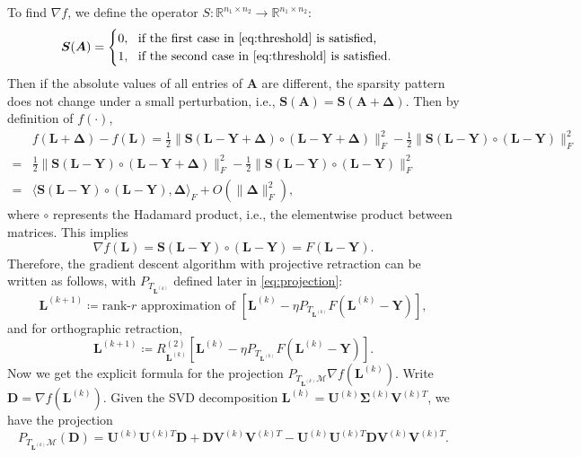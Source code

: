 \documentclass[12pt]{article}
\newcommand{\grad}{\nabla}
\newcommand{\bL}{\boldsymbol{L}}
\newcommand{\bD}{\boldsymbol{D}}
\newcommand{\bSigma}{\boldsymbol\Sigma}
\newcommand{\bDelta}{\boldsymbol\Delta}
\newcommand{\bU}{\boldsymbol{U}}
\newcommand{\bV}{\boldsymbol{V}}
\def\reals{\mathbb{R}}
\def\bS{\boldsymbol{S}}
\def\bSigma{\boldsymbol\Sigma}
\def\bDelta{\boldsymbol\Delta}
\def\bU{\boldsymbol{U}}
\def\bA{\boldsymbol{A}}
\def\bY{\boldsymbol{Y}}
\def\calM{\mathcal{M}}
\theoremstyle{plain}
\theoremstyle{definition}
\theoremstyle{plain}
\theoremstyle{plain}
\theoremstyle{remark}
\begin{document}
To find $\grad f$, we define the operator  $S: \reals^{n_1\times n_2}\rightarrow\reals^{n_1\times n_2}$: 
\[
\bS(\bA)=\begin{cases} 0,\,\,\,\, \text{if the first case in \eqref{eq:threshold} is satisfied,}\\
1,\,\,\,\, \text{if the second case in \eqref{eq:threshold} is satisfied.}\end{cases}
\]
Then if the absolute values of all entries of $\bA$ are different, the sparsity pattern does not change under a small perturbation, i.e., $\bS(\bA)=\bS(\bA+\bDelta).$ Then by definition of $f(\cdot)$,
\begin{align*}
&f(\bL+\bDelta)-f(\bL)=\frac{1}{2}\|\bS(\bL-\bY+\bDelta)\circ (\bL-\bY+\bDelta)\|_F^2-\frac{1}{2}\|\bS(\bL-\bY)\circ (\bL-\bY)\|_F^2\\
=&\frac{1}{2}\|\bS(\bL-\bY)\circ (\bL-\bY+\bDelta)\|_F^2-\frac{1}{2}\|\bS(\bL-\bY)\circ (\bL-\bY)\|_F^2\\
=&\langle\bS(\bL-\bY)\circ (\bL-\bY),\bDelta\rangle_{F}+O(\|\bDelta\|_F^2),
\end{align*}
where $\circ$ represents the Hadamard product, i.e., the elementwise product  between matrices. This implies
\begin{equation}\label{eq:derivative}
\grad f(\bL)=\bS(\bL-\bY)\circ (\bL-\bY)=F(\bL-\bY).
\end{equation}
Therefore, the gradient descent algorithm with projective retraction can be written as follows, with $P_{T_{\bL^{(k)}}}$ defined later in \eqref{eq:projection}: 
\begin{equation}\label{eq:alg_projective}
\bL^{(k+1)}\coloneqq \text{rank-$r$ approximation of }\left[\bL^{(k)}-\eta P_{T_{\bL^{(k)}}} F(\bL^{(k)}-\bY)\right],
\end{equation}
and for orthographic retraction,
\begin{equation}\label{eq:alg_orthographic}
\bL^{(k+1)}\coloneqq R^{(2)}_{\bL^{(k)}}\left[\bL^{(k)}-\eta P_{T_{\bL^{(k)}}} F(\bL^{(k)}-\bY)\right].
\end{equation}
Now we get the explicit formula for the projection { $P_{T_{\bL^{(k)}}\calM}\grad f(\bL^{(k)})$. Write $\bD=\grad f(\bL^{(k)})$.} Given the SVD decomposition $\bL^{(k)}=\bU^{(k)}\bSigma^{(k)}\bV^{(k)T}$, we have the projection
 \begin{equation}\label{eq:projection}
 P_{T_{\bL^{(k)}}\calM}(\bD)=\bU^{(k)}\bU^{(k)T}\bD+
  \bD\bV^{(k)}\bV^{(k)T}-\bU^{(k)}\bU^{(k)T}\bD\bV^{(k)}\bV^{(k)T}.
\end{equation}
\end{document}
